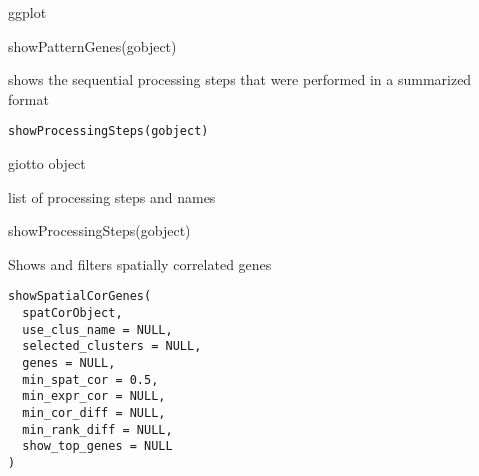 \documentclass[a4paper]{book}
\begin{document}
%
\begin{Value}
ggplot
\end{Value}
%
\begin{Examples}
\begin{ExampleCode}
    showPatternGenes(gobject)
\end{ExampleCode}
\end{Examples}
%
\begin{Description}\relax
shows the sequential processing steps that were performed in a summarized format
\end{Description}
%
\begin{Usage}
\begin{verbatim}
showProcessingSteps(gobject)
\end{verbatim}
\end{Usage}
%
\begin{Arguments}
\begin{ldescription}
\item[\code{gobject}] giotto object
\end{ldescription}
\end{Arguments}
%
\begin{Value}
list of processing steps and names
\end{Value}
%
\begin{Examples}
\begin{ExampleCode}
    showProcessingSteps(gobject)
\end{ExampleCode}
\end{Examples}
%
\begin{Description}\relax
Shows and filters spatially correlated genes
\end{Description}
%
\begin{Usage}
\begin{verbatim}
showSpatialCorGenes(
  spatCorObject,
  use_clus_name = NULL,
  selected_clusters = NULL,
  genes = NULL,
  min_spat_cor = 0.5,
  min_expr_cor = NULL,
  min_cor_diff = NULL,
  min_rank_diff = NULL,
  show_top_genes = NULL
)
\end{verbatim}
\end{Usage}
%
\end{document}
